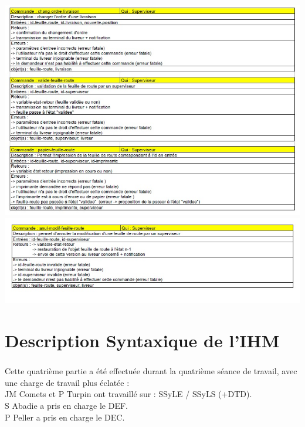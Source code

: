 \documentclass{report}
\begin{document}
\includegraphics[scale = 0.7]{images/DCOM6.jpg}\\
\includegraphics[scale = 0.7]{images/DCOM7.jpg}\\



\chapter{Description Syntaxique de l'IHM}

\paragraph{}
Cette quatrième partie a été effectuée durant la quatrième séance de travail, avec une charge de travail plus éclatée : \\

JM Comets et P Turpin ont travaillé sur : SSyLE / SSyLS (+DTD).\\

S Abadie a pris en charge le DEF.\\

P Peller a pris en charge le DEC.\\
\end{document}
